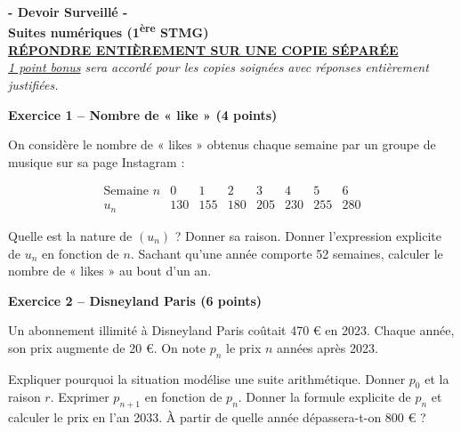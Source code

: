 \documentclass[12pt,a4paper]{exam}
\begin{document}
\begin{center}
\Large \textbf{- Devoir Surveillé -\\Suites numériques (1\textsuperscript{ère} STMG)}
\vspace{0.5cm}
\\\large \underline{\textbf{RÉPONDRE ENTIÈREMENT SUR UNE COPIE SÉPARÉE}}
\vspace{0.5cm}
\\ \textit{\underline{1 point bonus} sera accordé pour les copies soignées avec réponses 
entièrement justifiées.}
\end{center}
\vspace{0.4cm}
\noindent\hrulefill
\vspace{0.5cm}

\textbf{Exercice 1 – Nombre de « like » (4 points)}
\vspace{5pt}

On considère le nombre de « likes » obtenus chaque semaine par un groupe de musique
sur sa page Instagram :

\[
\begin{array}{c|c|c|c|c|c|c|c|}
\text{Semaine }n & 0 & 1 & 2 & 3 & 4 & 5 & 6\\
\hline
u_n & 130 & 155 & 180 & 205 & 230 & 255 & 280
\end{array}
\]
\vspace{2pt}
\begin{questions}
    \question[1,5] Quelle est la nature de \((u_n)\) ? Donner sa raison.
    \question[1,5] Donner l’expression explicite de \(u_n\) en fonction de $n$.
    \question[1] Sachant qu'une année comporte 52 semaines, calculer le nombre de « likes »
     au bout d'un an.
\end{questions}

\noindent\hrulefill
\vspace{0.5cm}

\textbf{Exercice 2 – Disneyland Paris (6 points)}
\vspace{5pt}

Un abonnement illimité à Disneyland Paris coûtait 470 € en 2023.  
Chaque année, son prix augmente de 20 €.  
On note \(p_n\) le prix \(n\) années après 2023.

\begin{questions}
    \question[1] Expliquer pourquoi la situation modélise une suite arithmétique.
    \question[1] Donner \(p_0\) et la raison \(r\).
    \question[1] Exprimer $p_{n+1}$ en fonction de $p_n$.
    \question[2] Donner la formule explicite de \(p_n\) et calculer le prix en l'an 2033.
    \question[1] À partir de quelle année dépassera-t-on 800 € ?
\end{questions}
\end{document}
